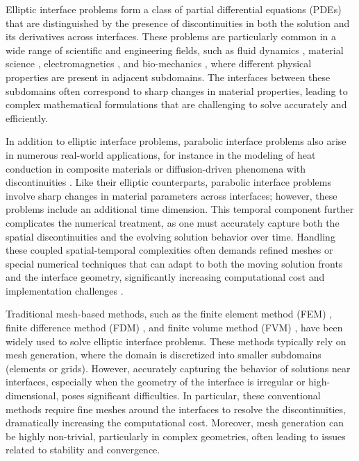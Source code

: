 \documentclass{article}
\begin{document}
Elliptic interface problems form a class of partial differential equations (PDEs) that are distinguished by the presence of discontinuities in both the solution and its derivatives across interfaces. These problems are particularly common in a wide range of scientific and engineering fields, such as fluid dynamics \cite{chern2007coupling}, material science \cite{wang2010embedded}, electromagnetics \cite{costabel1988strongly}, and bio-mechanics \cite{elhaddad2018multi}, where different physical properties are present in adjacent subdomains. The interfaces between these subdomains often correspond to sharp changes in material properties, leading to complex mathematical formulations that are challenging to solve accurately and efficiently.

In addition to elliptic interface problems, parabolic interface problems also arise in numerous real-world applications, for instance in the modeling of heat conduction in composite materials \cite{ahmadikia2012analytical} or diffusion-driven phenomena with discontinuities \cite{gennari2022phase}. Like their elliptic counterparts, parabolic interface problems involve sharp changes in material parameters across interfaces; however, these problems include an additional time dimension. This temporal component further complicates the numerical treatment, as one must accurately capture both the spatial discontinuities and the evolving solution behavior over time. Handling these coupled spatial-temporal complexities often demands refined meshes or special numerical techniques that can adapt to both the moving solution fronts and the interface geometry, significantly increasing computational cost and implementation challenges \cite{chen1998finite, astrakhantsev1971finite}.

Traditional mesh-based methods, such as the finite element method (FEM) \cite{costabel1990coupling, ciarlet2002finite, mu2016new, gong2008immersed, wang2018conforming, he2011immersed, chen1998finite, lin2013method, zhu2020stable}, finite difference method (FDM) \cite{li1990numerical,iliev2003generalized,feng2022high,feng2024sixth, cao2024finite, astrakhantsev1971finite}, and finite volume method (FVM) \cite{oevermann2009sharp, liu2019analysis, sevilla2018face, remmerswaal2022parabolic}, have been widely used to solve elliptic interface problems. These methods typically rely on mesh generation, where the domain is discretized into smaller subdomains (elements or grids). However, accurately capturing the behavior of solutions near interfaces, especially when the geometry of the interface is irregular or high-dimensional, poses significant difficulties. In particular, these conventional methods require fine meshes around the interfaces to resolve the discontinuities, dramatically increasing the computational cost. Moreover, mesh generation can be highly non-trivial, particularly in complex geometries, often leading to issues related to stability and convergence.
\end{document}
